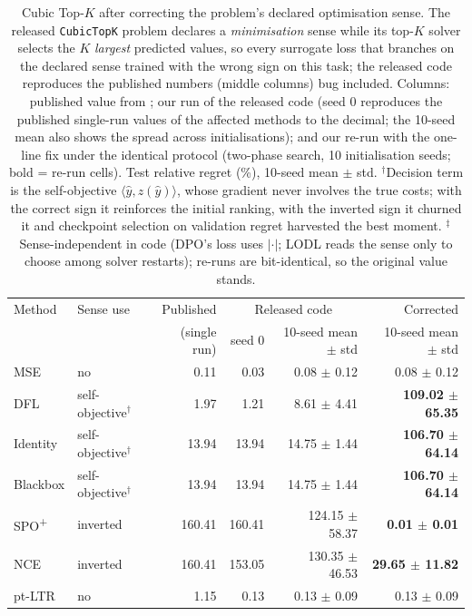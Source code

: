 \begin{table}[!h]
\centering
\small
\caption{Cubic Top-$K$ after correcting the problem's declared optimisation sense.
The released \texttt{CubicTopK} problem declares a \emph{minimisation} sense while its
top-$K$ solver selects the $K$ \emph{largest} predicted values, so every surrogate
loss that branches on the declared sense trained with the wrong sign on this task;
the released code reproduces the published numbers (middle columns) bug included.
Columns: published value from \citet{gengBenchmarkingPtOPnO2024}; our run of the
released code (seed 0 reproduces the published single-run values of the affected methods to the decimal; the 10-seed mean also shows the spread across initialisations); and our re-run with the one-line fix under the identical protocol
(two-phase search, 10 initialisation seeds; bold = re-run cells).
Test relative regret (\%), 10-seed mean $\pm$ std.
$^{\dagger}$Decision term is the self-objective $\langle\hat{y}, z(\hat{y})\rangle$,
whose gradient never involves the true costs; with the correct sign it reinforces the
initial ranking, with the inverted sign it churned it and checkpoint selection on
validation regret harvested the best moment. $^{\ddagger}$Sense-independent in code
(DPO's loss uses $|\cdot|$; LODL reads the sense only to choose among solver restarts);
re-runs are bit-identical, so the original value stands.}
\label{tab:cubic-sense-fix}
\begin{tabular}{l l r r r r}
\toprule
Method & Sense use & Published & \multicolumn{2}{c}{Released code} & Corrected \\
 & & (single run) & seed 0 & 10-seed mean $\pm$ std & 10-seed mean $\pm$ std \\
\midrule
MSE & no & 0.11 & 0.03 & 0.08 $\pm$ 0.12 & 0.08 $\pm$ 0.12 \\
DFL & self-objective$^{\dagger}$ & 1.97 & 1.21 & 8.61 $\pm$ 4.41 & \textbf{109.02 $\pm$ 65.35} \\
Identity & self-objective$^{\dagger}$ & 13.94 & 13.94 & 14.75 $\pm$ 1.44 & \textbf{106.70 $\pm$ 64.14} \\
Blackbox & self-objective$^{\dagger}$ & 13.94 & 13.94 & 14.75 $\pm$ 1.44 & \textbf{106.70 $\pm$ 64.14} \\
SPO\textsuperscript{+} & inverted & 160.41 & 160.41 & 124.15 $\pm$ 58.37 & \textbf{0.01 $\pm$ 0.01} \\
NCE & inverted & 160.41 & 153.05 & 130.35 $\pm$ 46.53 & \textbf{29.65 $\pm$ 11.82} \\
pt-LTR & no & 1.15 & 0.13 & 0.13 $\pm$ 0.09 & 0.13 $\pm$ 0.09 \\

\end{tabular}
\end{table}

